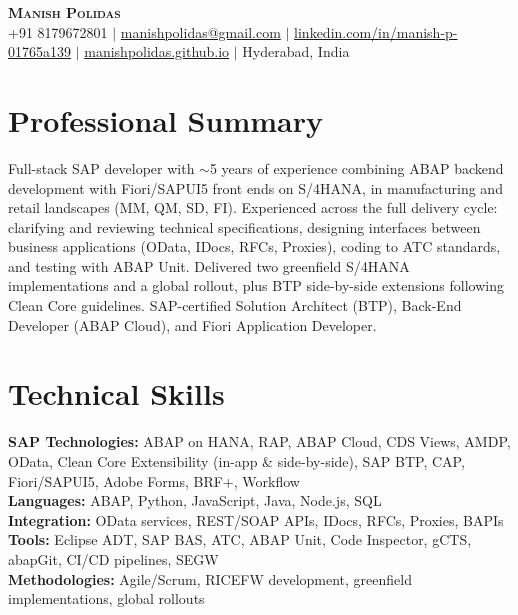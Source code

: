 \documentclass[letterpaper,11pt]{article}
\begin{document}
\begin{center}
    \textbf{\Huge \scshape Manish Polidas} \\ \vspace{1pt}
    \small +91 8179672801 $|$ \href{mailto:manishpolidas@gmail.com}{manishpolidas@gmail.com} $|$
    \href{https://www.linkedin.com/in/manish-p-01765a139/}{linkedin.com/in/manish-p-01765a139} $|$
    \href{https://manishpolidas.github.io}{manishpolidas.github.io} $|$ Hyderabad, India
\end{center}

\section{Professional Summary}
Full-stack SAP developer with $\sim$5 years of experience combining ABAP backend development with Fiori/SAPUI5 front ends on S/4HANA, in manufacturing and retail landscapes (MM, QM, SD, FI). Experienced across the full delivery cycle: clarifying and reviewing technical specifications, designing interfaces between business applications (OData, IDocs, RFCs, Proxies), coding to ATC standards, and testing with ABAP Unit. Delivered two greenfield S/4HANA implementations and a global rollout, plus BTP side-by-side extensions following Clean Core guidelines. SAP-certified Solution Architect (BTP), Back-End Developer (ABAP Cloud), and Fiori Application Developer.

\section{Technical Skills}
 \begin{itemize}[leftmargin=0.15in, label={}]
    \small{\item{
     \textbf{SAP Technologies:} ABAP on HANA, RAP, ABAP Cloud, CDS Views, AMDP, OData, Clean Core Extensibility (in-app \& side-by-side), SAP BTP, CAP, Fiori/SAPUI5, Adobe Forms, BRF+, Workflow \\
     \textbf{Languages:} ABAP, Python, JavaScript, Java, Node.js, SQL \\
     \textbf{Integration:} OData services, REST/SOAP APIs, IDocs, RFCs, Proxies, BAPIs \\
     \textbf{Tools:} Eclipse ADT, SAP BAS, ATC, ABAP Unit, Code Inspector, gCTS, abapGit, CI/CD pipelines, SEGW \\
     \textbf{Methodologies:} Agile/Scrum, RICEFW development, greenfield implementations, global rollouts \\
    }}
 \end{itemize}
\end{document}
